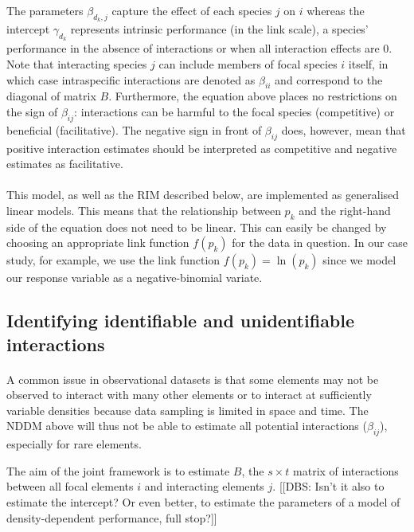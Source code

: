 \documentclass[a4,12pt]{article}
\begin{document}
        The parameters $\beta_{d_k,j}$ capture the effect of each species $j$ on $i$ whereas the intercept $\gamma_{d_k}$ represents intrinsic performance (in the link scale), a species' performance in the absence of interactions or when all interaction effects are $0$. Note that interacting species $j$ can include members of focal species $i$ itself, in which case intraspecific interactions are denoted as $\beta_{ii}$ and correspond to the diagonal of matrix $B$. Furthermore, the equation above places no restrictions on the sign of $\beta_{ij}$: interactions can be harmful to the focal species (competitive) or beneficial (facilitative). The negative sign in front of $\beta_{ij}$ does, however, mean that positive interaction estimates should be interpreted as competitive and negative estimates as facilitative.

        \paragraph{}
        This model, as well as the RIM described below, are implemented as generalised linear models. This means that the relationship between $p_k$ and the right-hand side of the equation does not need to be linear. This can easily be changed by choosing an appropriate link function $f(p_k)$ for the data in question. In our case study, for example, we use the link function $f(p_k) = \ln(p_k)$ since we model our response variable as a negative-binomial variate.
              

    \subsection{Identifying identifiable and unidentifiable interactions}
    \label{meth:id_params}

    \paragraph{}
    A common issue in observational datasets is that some elements may not be observed to interact with many other elements or to interact at sufficiently variable densities because data sampling is limited in space and time. The NDDM above will thus not be able to estimate all potential interactions ($\beta_{ij}$), especially for rare elements. 

    The aim of the joint framework is to estimate $B$, the $s \times t$ matrix of interactions between all focal elements $i$ and interacting elements $j$. [[DBS: Isn't it also to estimate the intercept? Or even better, to estimate the parameters of a model of density-dependent performance, full stop?]] 
\end{document}
